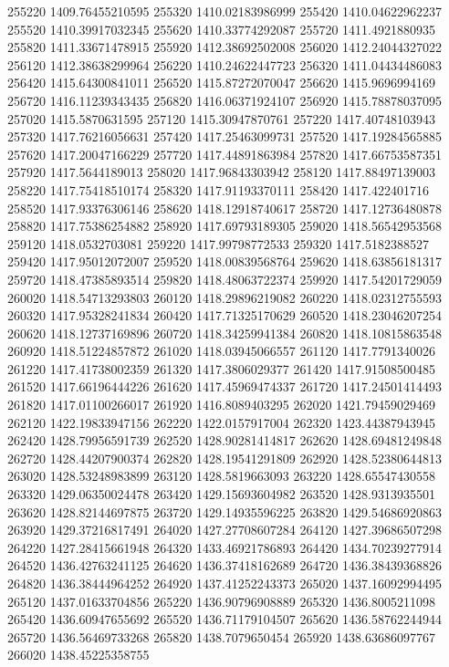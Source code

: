 {255220 1409.76455210595
255320 1410.02183986999
255420 1410.04622962237
255520 1410.39917032345
255620 1410.33774292087
255720 1411.4921880935
255820 1411.33671478915
255920 1412.38692502008
256020 1412.24044327022
256120 1412.38638299964
256220 1410.24622447723
256320 1411.04434486083
256420 1415.64300841011
256520 1415.87272070047
256620 1415.9696994169
256720 1416.11239343435
256820 1416.06371924107
256920 1415.78878037095
257020 1415.5870631595
257120 1415.30947870761
257220 1417.40748103943
257320 1417.76216056631
257420 1417.25463099731
257520 1417.19284565885
257620 1417.20047166229
257720 1417.44891863984
257820 1417.66753587351
257920 1417.5644189013
258020 1417.96843303942
258120 1417.88497139003
258220 1417.75418510174
258320 1417.91193370111
258420 1417.422401716
258520 1417.93376306146
258620 1418.12918740617
258720 1417.12736480878
258820 1417.75386254882
258920 1417.69793189305
259020 1418.56542953568
259120 1418.0532703081
259220 1417.99798772533
259320 1417.5182388527
259420 1417.95012072007
259520 1418.00839568764
259620 1418.63856181317
259720 1418.47385893514
259820 1418.48063722374
259920 1417.54201729059
260020 1418.54713293803
260120 1418.29896219082
260220 1418.02312755593
260320 1417.95328241834
260420 1417.71325170629
260520 1418.23046207254
260620 1418.12737169896
260720 1418.34259941384
260820 1418.10815863548
260920 1418.51224857872
261020 1418.03945066557
261120 1417.7791340026
261220 1417.41738002359
261320 1417.3806029377
261420 1417.91508500485
261520 1417.66196444226
261620 1417.45969474337
261720 1417.24501414493
261820 1417.01100266017
261920 1416.8089403295
262020 1421.79459029469
262120 1422.19833947156
262220 1422.0157917004
262320 1423.44387943945
262420 1428.79956591739
262520 1428.90281414817
262620 1428.69481249848
262720 1428.44207900374
262820 1428.19541291809
262920 1428.52380644813
263020 1428.53248983899
263120 1428.5819663093
263220 1428.65547430558
263320 1429.06350024478
263420 1429.15693604982
263520 1428.9313935501
263620 1428.82144697875
263720 1429.14935596225
263820 1429.54686920863
263920 1429.37216817491
264020 1427.27708607284
264120 1427.39686507298
264220 1427.28415661948
264320 1433.46921786893
264420 1434.70239277914
264520 1436.42763241125
264620 1436.37418162689
264720 1436.38439368826
264820 1436.38444964252
264920 1437.41252243373
265020 1437.16092994495
265120 1437.01633704856
265220 1436.90796908889
265320 1436.8005211098
265420 1436.60947655692
265520 1436.71179104507
265620 1436.58762244944
265720 1436.56469733268
265820 1438.7079650454
265920 1438.63686097767
266020 1438.45225358755
}
